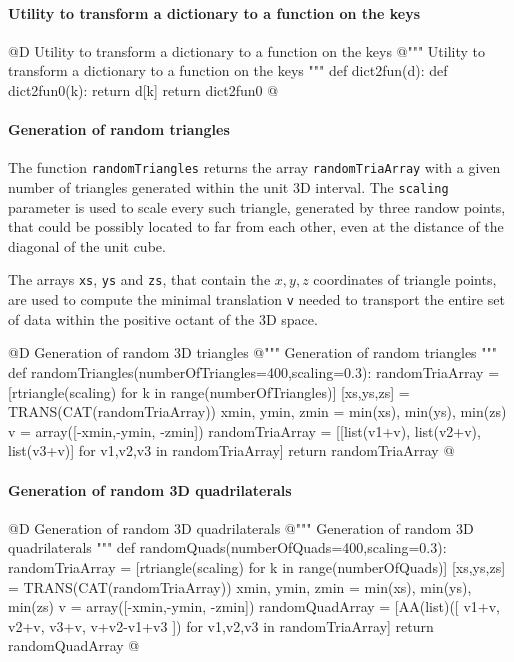 \documentclass[11pt,oneside]{article}    %
\begin{document}
\paragraph{Utility to transform a dictionary to a function on the keys}
@D Utility to transform a dictionary to a function on the keys
@{""" Utility to transform a dictionary to a function on the keys """
def dict2fun(d):
    def dict2fun0(k): return d[k]
    return dict2fun0 
@}

\paragraph{Generation of random triangles}
The function \texttt{randomTriangles} returns the array \texttt{randomTriaArray} with a given number of triangles generated within the unit 3D interval. The \texttt{scaling} parameter is used to scale every such triangle, generated by three randow points, that could be possibly located to far from each other, even at the distance of the diagonal of the unit cube.

The arrays \texttt{xs}, \texttt{ys} and \texttt{zs}, that contain the $x,y,z$ coordinates of triangle points, are used to compute the minimal translation \texttt{v} needed to transport the entire set of data within the positive octant of the 3D space. 

@D Generation of random 3D triangles
@{""" Generation of random triangles """
def randomTriangles(numberOfTriangles=400,scaling=0.3):
    randomTriaArray = [rtriangle(scaling) for k in range(numberOfTriangles)]
    [xs,ys,zs] = TRANS(CAT(randomTriaArray))
    xmin, ymin, zmin = min(xs), min(ys), min(zs)
    v = array([-xmin,-ymin, -zmin])
    randomTriaArray = [[list(v1+v), list(v2+v), list(v3+v)] for v1,v2,v3 in randomTriaArray]
    return randomTriaArray
@}

\paragraph{Generation of random 3D quadrilaterals}

@D Generation of random 3D quadrilaterals
@{""" Generation of random 3D quadrilaterals """
def randomQuads(numberOfQuads=400,scaling=0.3):
    randomTriaArray = [rtriangle(scaling) for k in range(numberOfQuads)]
    [xs,ys,zs] = TRANS(CAT(randomTriaArray))
    xmin, ymin, zmin = min(xs), min(ys), min(zs)
    v = array([-xmin,-ymin, -zmin])
    randomQuadArray = [AA(list)([ v1+v, v2+v, v3+v, v+v2-v1+v3 ]) for v1,v2,v3 in randomTriaArray]
    return randomQuadArray
@}
\end{document}
